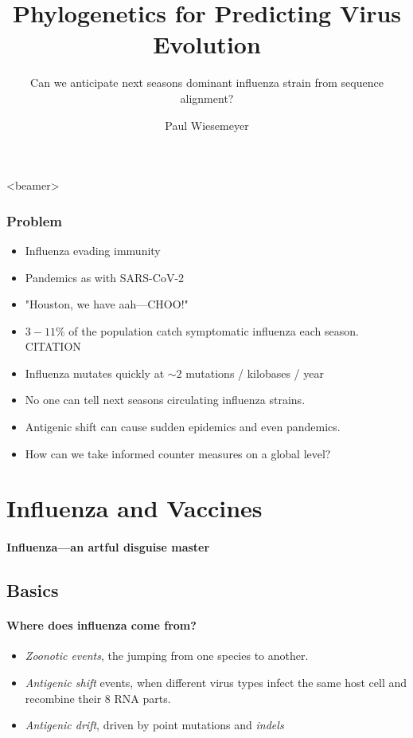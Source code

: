 \documentclass{beamer}
\title{Phylogenetics for Predicting Virus Evolution}
\subtitle{Can we anticipate next seasons dominant influenza strain from sequence alignment?}
\author{Paul Wiesemeyer}
\begin{document}
  \shorthandoff{-}
  \frame{\maketitle}

    
  \begin{darkframes}
  \begin{frame}<beamer>
    \frametitle{Problem}
    \begin{itemize}
      \item Influenza evading immunity
      \item Pandemics as with SARS-CoV-2
      \item "Houston, we have aah---CHOO!"
      \item $3 - 11 \% $ of the population catch symptomatic influenza each season. CITATION
      \item Influenza mutates quickly at $\sim 2$ mutations / kilobases / year
      \item No one can tell next seasons circulating influenza strains.
      \item Antigenic shift can cause sudden epidemics and even pandemics.
      \item How can we take informed counter measures on a global level?
    \end{itemize}
  \end{frame}

  \section{Influenza and Vaccines}

    \begin{frame}{\secname}
      \framesubtitle{Influenza---an artful disguise master}
    \end{frame}

    \subsection{Basics}

    \begin{frame}{\subsecname}
      \framesubtitle{Where does influenza come from?}
      \begin{itemize}
      \item \textit{Zoonotic events}, the jumping from one species to another.
      \item \textit{Antigenic shift} events, when different virus types infect the same host cell and recombine their 8 RNA parts.
      \item \textit{Antigenic drift}, driven by point mutations and \textit{indels}
      \end{itemize}
    \end{frame}


\end{darkframes}
\end{document}
